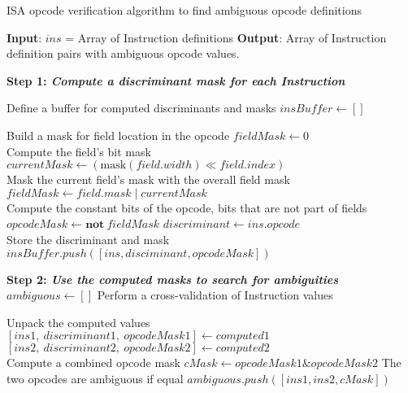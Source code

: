 \begin{algorithm}[hp!]
    \caption{ISA opcode verification algorithm to find ambiguous opcode definitions}
    \label{alg:lua:opcode-verification}
    \begin{algorithmic}[1]
        \Statex \textbf{Input}: $ins$ = Array of Instruction definitions
        \Statex \textbf{Output}: Array of Instruction definition pairs with ambiguous opcode values.
        
        \Statex \textbf{Step 1: \emph{Compute a discriminant mask for each Instruction}}
        
        \State Define a buffer for computed discriminants and masks
        \State $insBuffer \gets \left[\right]$
            
            \State Build a mask for field location in the opcode
            \State $fieldMask \gets 0$
            \\
                \State Compute the field's bit mask
                \State $currentMask \gets \left( \text{mask}\left( field.width \right) \ll field.index \right)$
                \\
                \State Mask the current field's mask with the overall field mask
                \State $fieldMask \gets field.mask \mathrel{|} currentMask$
            \EndFor
            \\
            \State Compute the constant bits of the opcode, bits that are not part of fields
            \State $opcodeMask \gets \textbf{not}~fieldMask$
            \State $discriminant \gets ins.opcode$
            \\
            \State Store the discriminant and mask
            \State $insBuffer.push\left( \left[ins, disciminant, opcodeMask \right] \right)$
        \EndFor
        
        \Statex\textbf{Step 2: \emph{Use the computed masks to search for ambiguities}}
        \State $ambiguous \gets \left[\right]$
        \State Perform a cross-validation of Instruction values
                
                \State Unpack the computed values
                \State $[ins1,~ discriminant1,~ opcodeMask1] \gets computed1$
                \State $[ins2,~ discriminant2,~ opcodeMask2] \gets computed2$
                \\
                \State Compute a combined opcode mask
                \State $cMask \gets opcodeMask1 \mathrel{\&} opcodeMask2$
                    \State The two opcodes are ambiguous if equal
                    \State $ambiguous.push\left(\left[ins1, ins2, cMask\right]\right)$
                \EndIf
            \EndFor
        \EndFor
        
    \end{algorithmic}
\end{algorithm}


